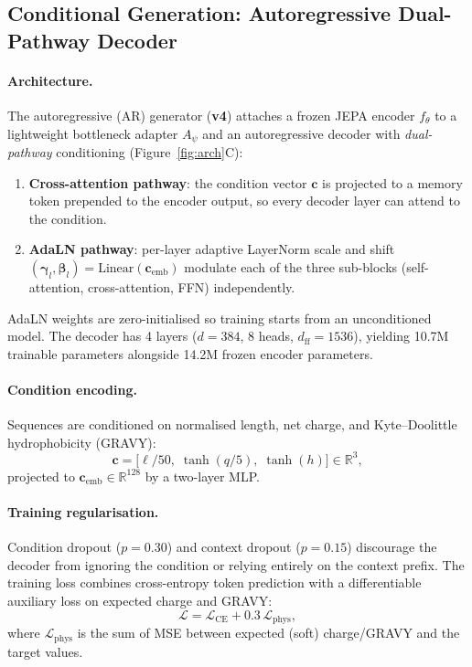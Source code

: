 \subsection{Conditional Generation: Autoregressive Dual-Pathway Decoder}
\label{sec:methods_gen}

\paragraph{Architecture.}
The autoregressive (AR) generator (\textbf{v4}) attaches a frozen JEPA
encoder $f_\theta$ to a lightweight bottleneck adapter $A_\psi$ and an
autoregressive decoder with \emph{dual-pathway} conditioning
(Figure~\ref{fig:arch}C):
\begin{enumerate}[noitemsep]
  \item \textbf{Cross-attention pathway}: the condition vector $\mathbf{c}$
        is projected to a memory token prepended to the encoder output,
        so every decoder layer can attend to the condition.
  \item \textbf{AdaLN pathway}: per-layer adaptive LayerNorm scale and shift
        $(\boldsymbol{\gamma}_l, \boldsymbol{\beta}_l) =
        \text{Linear}(\mathbf{c}_\text{emb})$
        modulate each of the three sub-blocks (self-attention, cross-attention,
        FFN) independently.
\end{enumerate}
AdaLN weights are zero-initialised so training starts from an unconditioned
model.
The decoder has 4 layers ($d=384$, 8 heads, $d_\text{ff}=1536$),
yielding 10.7M trainable parameters alongside 14.2M frozen encoder parameters.

\paragraph{Condition encoding.}
Sequences are conditioned on normalised length, net charge, and
Kyte--Doolittle hydrophobicity (GRAVY):
\begin{equation}
\mathbf{c} = \bigl[\ell/50,\;\tanh(q/5),\;\tanh(h)\bigr] \in \mathbb{R}^3,
\end{equation}
projected to $\mathbf{c}_\text{emb} \in \mathbb{R}^{128}$ by a two-layer MLP.

\paragraph{Training regularisation.}
Condition dropout ($p=0.30$) and context dropout ($p=0.15$) discourage the
decoder from ignoring the condition or relying entirely on the context prefix.
The training loss combines cross-entropy token prediction with a differentiable
auxiliary loss on expected charge and GRAVY:
\begin{equation}
  \mathcal{L} = \mathcal{L}_\text{CE}
  + 0.3\,\mathcal{L}_\text{phys},
  \label{eq:gen_loss}
\end{equation}
where $\mathcal{L}_\text{phys}$ is the sum of MSE between expected (soft)
charge/GRAVY and the target values.

